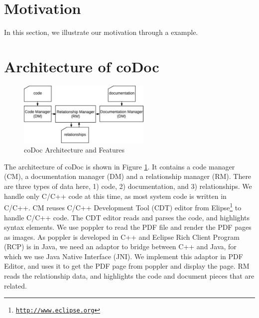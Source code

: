 \documentclass[conference]{IEEEtran}
\begin{document}
%
%

\section{Motivation}
\label{sec:motivation}
In this section, we illustrate our motivation through a example.

\section{Architecture of coDoc}
\label{sec:arch}

\begin{figure}
\centering
\includegraphics[width=2.5in]{architecture}
\caption{coDoc Architecture and Features}
\label{fig:architecture}
\end{figure}

The architecture of coDoc is shown in Figure \ref{fig:architecture}. 
It contains a code manager (CM), a documentation manager (DM) and a relationship manager (RM).
There are three types of data here, 1) code, 2) documentation, and 3) relationships.
We handle only C/C++ code at this time, 
as most system code is written in C/C++.
CM reuses C/C++ Development Tool (CDT) editor from Elipse\footnote{\texttt{\url{http://www.eclipse.org}}} to handle C/C++ code.
The CDT editor reads and parses the code, 
and highlights syntax elements.
We use poppler to read the PDF file and render the PDF pages as images.
As poppler is developed in C++ and Eclipse Rich Client Program (RCP) is in Java,
we need an adaptor to bridge between C++ and Java,
for which we use Java Native Interface (JNI).
We implement this adaptor in PDF Editor, 
and uses it to get the PDF page from poppler and display the page.
RM reads the relationship data,
and highlights the code and document pieces that are related.
\end{document}
